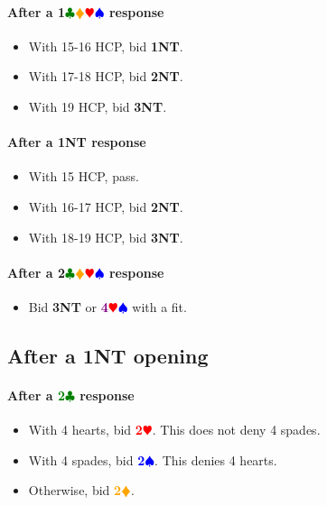 \documentclass{article}
\newcommand{\Hs}{\textcolor{Red}{$\varheart$}}
\newcommand{\Ss}{\textcolor{Blue}{$\spadesuit$}}
\newcommand{\Ds}{\textcolor{Orange}{$\vardiamond$}}
\newcommand{\Cs}{\textcolor{Green}{$\clubsuit$}}
\newcommand{\NTs}{\textbf{\footnotesize{NT}}}
\renewcommand{\H}[1]{\textcolor{Red}{\textbf{#1}\Hs}}
\renewcommand{\S}[1]{\textcolor{Blue}{\textbf{#1}\Ss}}
\newcommand{\D}[1]{\textcolor{Orange}{\textbf{#1}\Ds}}
\newcommand{\C}[1]{\textcolor{Green}{\textbf{#1}\Cs}}
\newcommand{\NT}[1]{\textbf{#1\NTs}}
\newcommand{\suits}[1]{\textbf{#1}\Cs\Ds\Hs\Ss}
\newcommand{\majors}[1]{\textcolor{Purple}{\textbf{#1}}\Hs\Ss}
\begin{document}

\paragraph{After a \suits{1} response}

\begin{itemize}
\item With 15-16 HCP, bid \NT{1}.
\item With 17-18 HCP, bid \NT{2}.
\item With 19 HCP, bid \NT{3}.
\end{itemize}

\paragraph{After a \NT{1} response}

\begin{itemize}
\item With 15 HCP, pass.
\item With 16-17 HCP, bid \NT{2}.
\item With 18-19 HCP, bid \NT{3}.
\end{itemize}

\paragraph{After a \suits{2} response}

\begin{itemize}
\item Bid \NT{3} or \majors{4} with a fit.
\end{itemize}


\subsection{After a \NT{1} opening}

\paragraph{After a \C{2} response}

\begin{itemize}
\item With 4 hearts, bid \H{2}. This does not deny 4 spades.
\item With 4 spades, bid \S{2}. This denies 4 hearts.
\item Otherwise, bid \D{2}.
\end{itemize}
\end{document}
